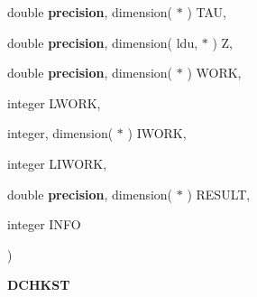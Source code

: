 {\begin{DoxyParamCaption}
\item[{double {\bf precision}, dimension( $\ast$ )}]{T\+A\+U, }
\item[{double {\bf precision}, dimension( ldu, $\ast$ )}]{Z, }
\item[{double {\bf precision}, dimension( $\ast$ )}]{W\+O\+R\+K, }
\item[{integer}]{L\+W\+O\+R\+K, }
\item[{integer, dimension( $\ast$ )}]{I\+W\+O\+R\+K, }
\item[{integer}]{L\+I\+W\+O\+R\+K, }
\item[{double {\bf precision}, dimension( $\ast$ )}]{R\+E\+S\+U\+L\+T, }
\item[{integer}]{I\+N\+F\+O}
\end{DoxyParamCaption}
)}\label{group__double__eig_ga9fcde518d0efadd400e7ddf07235f188}


{\bfseries D\+C\+H\+K\+S\+T} 

